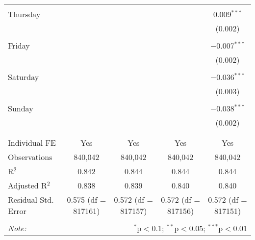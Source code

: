 \documentclass[
]{article}
\begin{document}
\begin{table}[!htbp]
{\begin{tabular}{@{\extracolsep{5pt}}lcccc}
  & & & & \\ 
 Thursday &  &  &  & 0.009$^{***}$ \\ 
  &  &  &  & (0.002) \\ 
  & & & & \\ 
 Friday &  &  &  & $-$0.007$^{***}$ \\ 
  &  &  &  & (0.002) \\ 
  & & & & \\ 
 Saturday &  &  &  & $-$0.036$^{***}$ \\ 
  &  &  &  & (0.003) \\ 
  & & & & \\ 
 Sunday &  &  &  & $-$0.038$^{***}$ \\ 
  &  &  &  & (0.002) \\ 
  & & & & \\ 
\hline \\[-1.8ex] 
Individual FE & Yes & Yes & Yes & Yes \\ 
Observations & 840,042 & 840,042 & 840,042 & 840,042 \\ 
R$^{2}$ & 0.842 & 0.844 & 0.844 & 0.844 \\ 
Adjusted R$^{2}$ & 0.838 & 0.839 & 0.840 & 0.840 \\ 
Residual Std. Error & 0.575 (df = 817161) & 0.572 (df = 817157) & 0.572 (df = 817156) & 0.572 (df = 817151) \\ 
\hline 
\hline \\[-1.8ex] 
\textit{Note:}  & \multicolumn{4}{r}{$^{*}$p$<$0.1; $^{**}$p$<$0.05; $^{***}$p$<$0.01} \\ 
\end{tabular}
} 
\end{table} 
\newpage
\end{document}
